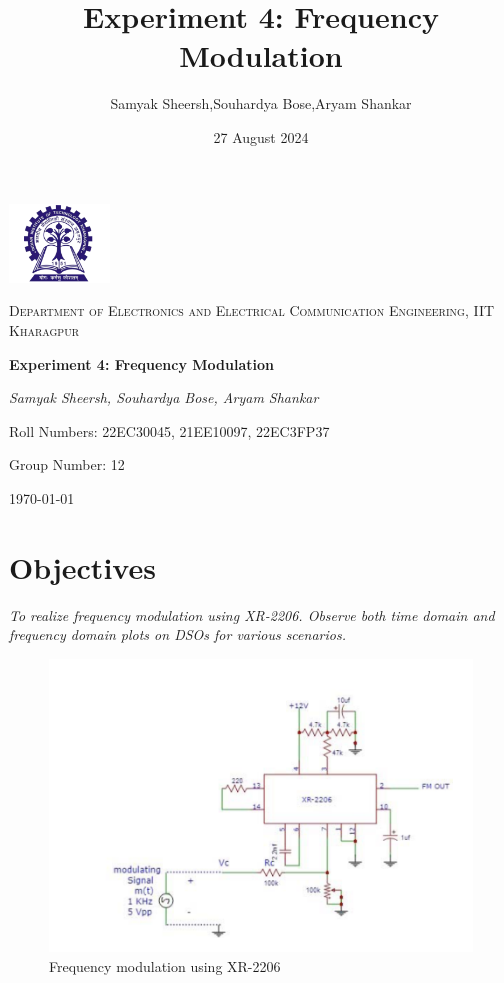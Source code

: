 \documentclass{article}
\title{Experiment 4: Frequency Modulation}
\author{Samyak Sheersh,Souhardya Bose,Aryam Shankar}
\date{27 August 2024}
\begin{document}
\begin{titlepage}
    \centering
    \includegraphics[width=0.2\textwidth]{KGP_logo.png}\par\vspace{1cm}
    {\scshape\LARGE Department of Electronics and Electrical Communication Engineering, IIT Kharagpur\par}
    \vspace{1cm}
    {\huge\bfseries Experiment 4: Frequency Modulation\par}
    \vspace{1.5cm}
    {\Large\itshape Samyak Sheersh, Souhardya Bose, Aryam Shankar\par}
    \vfill
    {\large Roll Numbers: 22EC30045, 21EE10097, 22EC3FP37\par}
    {\large Group Number: 12\par}
    \vfill
    {\large \today \par}
\end{titlepage}



\section{Objectives}
\emph{To realize frequency modulation using XR-2206. Observe both time domain
and frequency domain plots on DSOs for various scenarios.}
\begin{figure}[!ht]
\includegraphics[width=\textwidth]{FM_using_ic.png}
\caption{Frequency modulation using XR-2206}
\label{fig:fm_circuit}
\end{figure}
\end{document}
